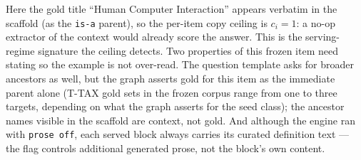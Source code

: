 \documentclass[10pt,twocolumn]{article}
\begin{document}
\noindent Here the gold title ``Human Computer Interaction'' appears verbatim in the scaffold
(as the \texttt{is-a} parent), so the per-item copy ceiling is $c_i=1$: a no-op extractor of the
context would already score the answer. This is the serving-regime signature the ceiling detects.
Two properties of this frozen item need stating so the example is not over-read. The question
template asks for broader ancestors as well, but the graph asserts gold for this item as the
immediate parent alone (T-TAX gold sets in the frozen corpus range from one to three targets,
depending on what the graph asserts for the seed class); the ancestor names visible in the
scaffold are context, not gold. And although the engine ran with \texttt{prose~off}, each served
block always carries its curated definition text --- the flag controls additional generated prose,
not the block's own content.

\printbibliography
\end{document}
